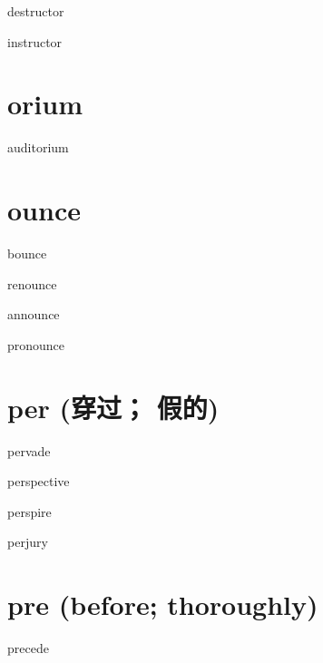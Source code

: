 \begin{RefWord}{destructor}
\end{RefWord}

\begin{RefWord}{instructor}
\end{RefWord}

\section{orium}

\begin{RefWord}{auditorium}
\end{RefWord}


\section{ounce}

\begin{RefWord}{bounce}
\end{RefWord}

\begin{RefWord}{renounce}
\end{RefWord}

\begin{RefWord}{announce}
\end{RefWord}

\begin{RefWord}{pronounce}
\end{RefWord}



\section{per (穿过； 假的)}


\begin{RefWord}{pervade}
\end{RefWord}

\begin{RefWord}{perspective}
\end{RefWord}

\begin{RefWord}{perspire}
\end{RefWord}

\begin{RefWord}{perjury}
\end{RefWord}

\section{pre (before; thoroughly)}
\begin{RefWord}{precede}
\end{RefWord}

